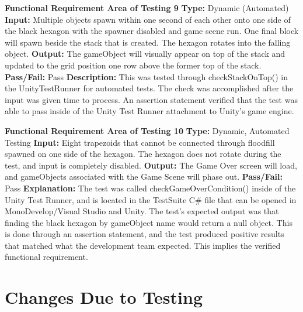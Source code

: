 \documentclass[12pt, titlepage]{article}
\begin{document}
    
    \noindent \textbf{Functional Requirement Area of Testing 9}
    \newline
    \textbf{Type:} Dynamic (Automated)
    \newline
    \textbf{Input:} Multiple objects spawn within one second of each other onto one side of the black hexagon with the spawner disabled and game scene run. One final block will spawn beside the stack that is created. The hexagon rotates into the falling object.
    \newline
    \textbf{Output:} The gameObject will visually appear on top of the stack and updated to the grid position one row above the former top of the stack.
    \newline
    \textbf{Pass/Fail:} Pass
    \newline
    \textbf{Description:} This was tested through checkStackOnTop() in the UnityTestRunner for automated tests. The check was accomplished after the input was given time to process. An assertion statement verified that the test was able to pass inside of the Unity Test Runner attachment to Unity's game engine.  \newline
    
    \noindent \textbf{Functional Requirement Area of Testing 10}
    \newline
    \textbf{Type:} Dynamic, Automated Testing
    \newline
    \textbf{Input:} Eight trapezoids that cannot be connected through floodfill spawned on one side of the hexagon. The hexagon does not rotate during the test, and input is completely disabled.
    \newline
    \textbf{Output:} The Game Over screen will load, and gameObjects associated with the Game Scene will phase out.
    \newline
    \textbf{Pass/Fail:} Pass
    \newline
    \textbf{Explanation:} The test was called checkGameOverCondition() inside of the Unity Test Runner, and is located in the TestSuite C\# file that can be opened in MonoDevelop/Visual Studio and Unity. The test's expected output was that finding the black hexagon by gameObject name would return a null object. This is done through an assertion statement, and the test produced positive results that matched what the development team expected. This implies the verified functional requirement.  

\section{Changes Due to Testing}
\end{document}
